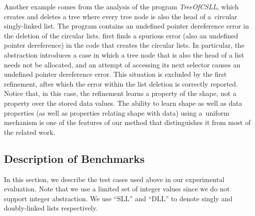{Another example comes from the analysis of the program \emph{TreeOfCSLL}, which
creates and deletes a tree where every tree node is also the head of a~circular
singly-linked list.
%
The program contains an undefined pointer dereference error in the deletion of the
circular lists.
%
\forester{} first finds a spurious error (also an undefined pointer dereference)
in the code that creates the circular lists.
%
In particular, the abstraction introduces a case in which a tree node that is
also the head of a list needs not be allocated, and an attempt of accessing its
next selector causes an undefined pointer dereference error. 
%
This situation is excluded by the first refinement, after which the error within
the list deletion is correctly reported.
%
Notice that, in this case, the refinement learns a property of the shape, not a
property over the stored data values. 
%
%
The ability to learn shape as well as data properties (as well as properties
relating shape with data) using a~uniform mechanism is one of the features of our
method that distinguishes it from most of the related work.


\subsection{Description of Benchmarks}\label{sec:testcases}

In this section, we describe the test cases used above in our experimental
evaluation.
Note that we use a limited set of integer values since we do not support
integer abstraction.
We use ``SLL'' and ``DLL'' to denote singly and doubly-linked lists
respectively.

}
